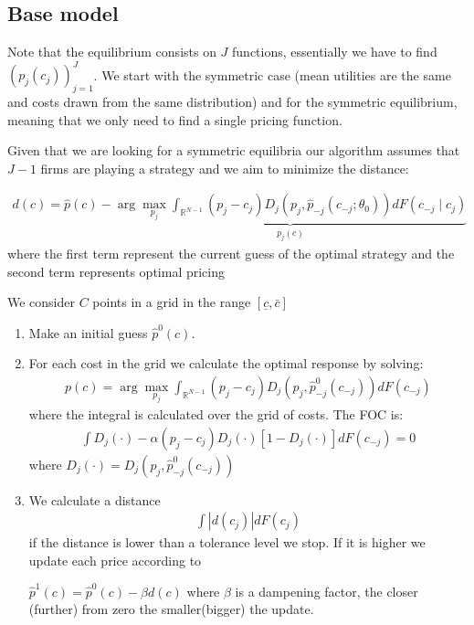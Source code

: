 \documentclass[12pt]{article}
\begin{document}
\subsection{Base model}
Note that the equilibrium consists on $J$ functions, essentially we have to find $(p_j(c_j))_{j=1}^J$. We start with the symmetric case (mean utilities are the same and costs drawn from the same distribution) and for the symmetric equilibrium, meaning that we only need to find a single pricing function. 

Given that we are looking for a symmetric equilibria our algorithm assumes that $J-1$ firms are playing a strategy  and we aim to minimize the distance: 


\begin{align}
    d(c) = \hat{p}(c) -\underbrace{\arg \max_{p_j} \int_{\mathbb{R}^{N-1}}^{} (p_j - c_j) D_j(p_j, \hat{p}_{-j}(c_{-j}; \theta_0)) dF(c_{-j} \mid c_j)}_{p_j(c)}
\end{align} 
where the first term represent the current guess of the optimal strategy and the  second term represents optimal pricing 


We consider $C$ points in a grid in the range $[\underline{c}, \bar{c}] $

\begin{enumerate}
    \item Make an initial guess $\hat{p}^0(c)$. 
    \item For each cost in the grid we calculate the optimal response by solving: 
    \begin{align}
        p(c) = \arg \max_{p_j} \int_{\mathbb{R}^{N-1}}^{} (p_j - c_j) D_j(p_j, \hat{p}^0_{-j}(c_{-j})) dF(c_{-j})
    \end{align}  
    where the integral is calculated over the grid of costs.
    The FOC is:  
    \begin{align}
        \int D_j(\cdot) -\alpha  (p_j - c_j)  D_j(\cdot) [1-D_j(\cdot)] dF(c_{-j}) = 0 
    \end{align} 
    where $D_j(\cdot) = D_j(p_j, \hat{p}^0_{-j}(c_{-j}))$
    

    
    \item We calculate a distance 
    \begin{align}
        \int | d(c_j) | dF(c_j)
    \end{align}
    if the distance is lower than a tolerance level we stop. If it is higher we update each price according to 

    $\hat{p}^1(c) = \hat{p}^0(c) - \beta d(c)$
    where $\beta$ is a dampening factor, the closer (further) from zero the smaller(bigger) the update. 
\end{enumerate}
\end{document}
